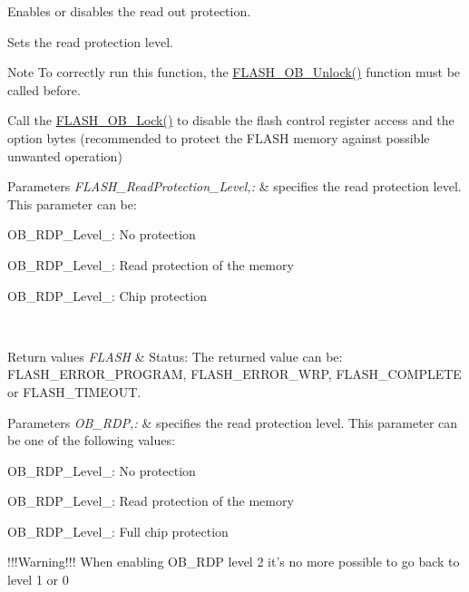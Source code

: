 Enables or disables the read out protection. 

Sets the read protection level.

\begin{DoxyNote}{Note}
To correctly run this function, the \hyperlink{group___f_l_a_s_h___group3_ga518d6e3bbba2adf1523e8454f62348e9}{F\-L\-A\-S\-H\-\_\-\-O\-B\-\_\-\-Unlock()} function must be called before. 

Call the \hyperlink{group___f_l_a_s_h___group3_ga63a33d9af7e29b64c3806e5505c59b74}{F\-L\-A\-S\-H\-\_\-\-O\-B\-\_\-\-Lock()} to disable the flash control register access and the option bytes (recommended to protect the F\-L\-A\-S\-H memory against possible unwanted operation) 
\end{DoxyNote}

\begin{DoxyParams}{Parameters}
{\em F\-L\-A\-S\-H\-\_\-\-Read\-Protection\-\_\-\-Level,\-:} & specifies the read protection level. This parameter can be\-: \begin{DoxyItemize}
\item O\-B\-\_\-\-R\-D\-P\-\_\-\-Level\-\_\-: No protection \item O\-B\-\_\-\-R\-D\-P\-\_\-\-Level\-\_\-: Read protection of the memory \item O\-B\-\_\-\-R\-D\-P\-\_\-\-Level\-\_\-: Chip protection \end{DoxyItemize}
\\
\hline
\end{DoxyParams}

\begin{DoxyRetVals}{Return values}
{\em F\-L\-A\-S\-H} & Status\-: The returned value can be\-: F\-L\-A\-S\-H\-\_\-\-E\-R\-R\-O\-R\-\_\-\-P\-R\-O\-G\-R\-A\-M, F\-L\-A\-S\-H\-\_\-\-E\-R\-R\-O\-R\-\_\-\-W\-R\-P, F\-L\-A\-S\-H\-\_\-\-C\-O\-M\-P\-L\-E\-T\-E or F\-L\-A\-S\-H\-\_\-\-T\-I\-M\-E\-O\-U\-T.\\
\hline
\end{DoxyRetVals}

\begin{DoxyParams}{Parameters}
{\em O\-B\-\_\-\-R\-D\-P,\-:} & specifies the read protection level. This parameter can be one of the following values\-: \begin{DoxyItemize}
\item O\-B\-\_\-\-R\-D\-P\-\_\-\-Level\-\_\-: No protection \item O\-B\-\_\-\-R\-D\-P\-\_\-\-Level\-\_\-: Read protection of the memory \item O\-B\-\_\-\-R\-D\-P\-\_\-\-Level\-\_\-: Full chip protection\end{DoxyItemize}
!!!\-Warning!!! When enabling O\-B\-\_\-\-R\-D\-P level 2 it's no more possible to go back to level 1 or 0\\
\hline
\end{DoxyParams}

